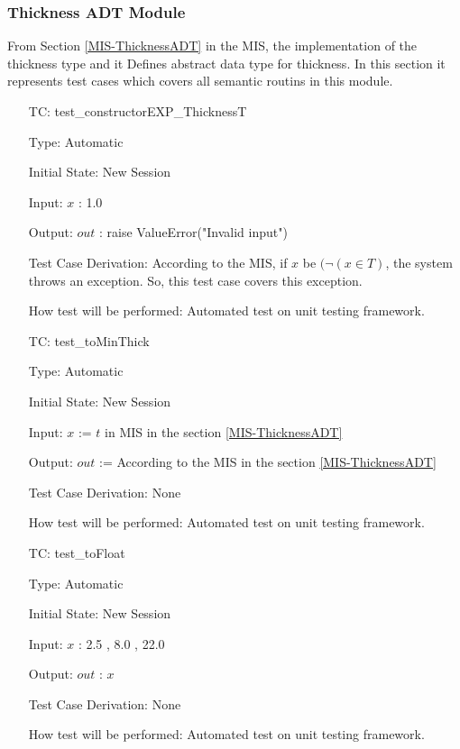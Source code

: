 \documentclass[12pt]{article}
\newcounter{utestnum} %
\begin{document}
\subsubsection{Thickness ADT Module}	
From Section \ref{MIS-ThicknessADT} in the MIS, the implementation of the thickness type and it Defines abstract data type for thickness. In this section it represents test cases which covers all semantic routins in this module.

\begin{enumerate}[label=TC\arabic*:,ref={\arabic*}]
	
	\item [TC\refstepcounter{utestnum}\theutestnum: \label{ConstructorEXPThicknessTest}] 
	test\_constructorEXP\_ThicknessT
	
	Type: Automatic
	
	Initial State: New Session
	
	Input: $x$ : 1.0
	
	Output: $out$ : raise ValueError("Invalid input")
	
	
	Test Case Derivation: According to the MIS, if $x$ be $(\neg (x \in T)$, the system throws an exception. So, this test case covers this exception.
	
	
	How test will be performed: Automated test on unit testing framework.
	
	\item [TC\refstepcounter{utestnum}\theutestnum: \label{toMinThickTest}] 
	test\_toMinThick
	
	Type: Automatic
	
	Initial State: New Session
	
	Input: $x$ := $t$ in MIS in the section \ref{MIS-ThicknessADT}
	
	
	Output: $out$ := According to the MIS in the section \ref{MIS-ThicknessADT}
	
		
	Test Case Derivation: None
	
	How test will be performed: Automated test on unit testing framework.
	
		\item [TC\refstepcounter{utestnum}\theutestnum: \label{toFloatTest}] 
test\_toFloat
	
	Type: Automatic
	
	Initial State: New Session
	
	Input: $x$ : 2.5 , 8.0 , 22.0
	
	Output: $out$ : $x$
	
	
	Test Case Derivation: None
	
	
	How test will be performed: Automated test on unit testing framework.
	
	
	
\end{enumerate}
	
\end{document}
